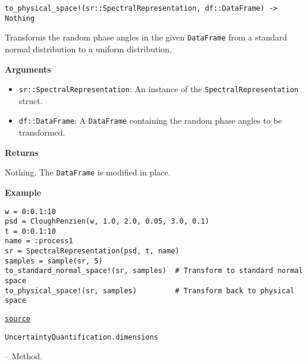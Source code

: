 \begin{adjustwidth}{2em}{0pt}


\begin{verbatim}
to_physical_space!(sr::SpectralRepresentation, df::DataFrame) -> Nothing
\end{verbatim}

Transforms the random phase angles in the given \texttt{DataFrame} from a standard normal distribution to a uniform distribution.

\textbf{Arguments}

\begin{itemize}
\item \texttt{sr::SpectralRepresentation}: An instance of the \texttt{SpectralRepresentation} struct.


\item \texttt{df::DataFrame}: A \texttt{DataFrame} containing the random phase angles to be transformed.

\end{itemize}
\textbf{Returns}

Nothing. The \texttt{DataFrame} is modified in place.

\textbf{Example}


\begin{verbatim}
w = 0:0.1:10
psd = CloughPenzien(w, 1.0, 2.0, 0.05, 3.0, 0.1)
t = 0:0.1:10
name = :process1
sr = SpectralRepresentation(psd, t, name)
samples = sample(sr, 5)
to_standard_normal_space!(sr, samples)  # Transform to standard normal space
to_physical_space!(sr, samples)         # Transform back to physical space
\end{verbatim}



\href{https://github.com/friesischscott/UncertaintyQuantification.jl/blob/f5ee6cce729f0d6a57979257379c942cdf42f86f/src/inputs/stochasticprocesses/spectralrepresentation.jl#L162-L186}{\texttt{source}}


\end{adjustwidth}
\hypertarget{17794587236484596438}{\texttt{UncertaintyQuantification.dimensions}}  -- {Method.}

